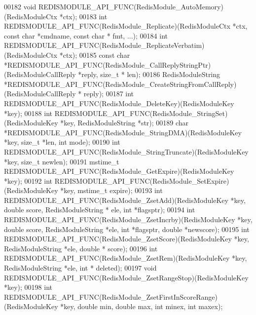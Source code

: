 \begin{DoxyCode}
00182 \textcolor{keywordtype}{void} REDISMODULE\_API\_FUNC(RedisModule\_AutoMemory)(RedisModuleCtx *ctx);
00183 \textcolor{keywordtype}{int} REDISMODULE\_API\_FUNC(RedisModule\_Replicate)(RedisModuleCtx *ctx, \textcolor{keyword}{const} \textcolor{keywordtype}{char} *cmdname, \textcolor{keyword}{const} \textcolor{keywordtype}{char} *
      fmt, ...);
00184 \textcolor{keywordtype}{int} REDISMODULE\_API\_FUNC(RedisModule\_ReplicateVerbatim)(RedisModuleCtx *ctx);
00185 \textcolor{keyword}{const} \textcolor{keywordtype}{char} *REDISMODULE\_API\_FUNC(RedisModule\_CallReplyStringPtr)(RedisModuleCallReply *reply, size\_t *
      len);
00186 RedisModuleString *REDISMODULE\_API\_FUNC(RedisModule\_CreateStringFromCallReply)(RedisModuleCallReply *
      reply);
00187 \textcolor{keywordtype}{int} REDISMODULE\_API\_FUNC(RedisModule\_DeleteKey)(RedisModuleKey *key);
00188 \textcolor{keywordtype}{int} REDISMODULE\_API\_FUNC(RedisModule\_StringSet)(RedisModuleKey *key, RedisModuleString *str);
00189 \textcolor{keywordtype}{char} *REDISMODULE\_API\_FUNC(RedisModule\_StringDMA)(RedisModuleKey *key, size\_t *len, \textcolor{keywordtype}{int} mode);
00190 \textcolor{keywordtype}{int} REDISMODULE\_API\_FUNC(RedisModule\_StringTruncate)(RedisModuleKey *key, size\_t newlen);
00191 mstime\_t REDISMODULE\_API\_FUNC(RedisModule\_GetExpire)(RedisModuleKey *key);
00192 \textcolor{keywordtype}{int} REDISMODULE\_API\_FUNC(RedisModule\_SetExpire)(RedisModuleKey *key, mstime\_t expire);
00193 \textcolor{keywordtype}{int} REDISMODULE\_API\_FUNC(RedisModule\_ZsetAdd)(RedisModuleKey *key, \textcolor{keywordtype}{double} score, RedisModuleString *
      ele, \textcolor{keywordtype}{int} *flagsptr);
00194 \textcolor{keywordtype}{int} REDISMODULE\_API\_FUNC(RedisModule\_ZsetIncrby)(RedisModuleKey *key, \textcolor{keywordtype}{double} score, RedisModuleString 
      *ele, \textcolor{keywordtype}{int} *flagsptr, \textcolor{keywordtype}{double} *newscore);
00195 \textcolor{keywordtype}{int} REDISMODULE\_API\_FUNC(RedisModule\_ZsetScore)(RedisModuleKey *key, RedisModuleString *ele, \textcolor{keywordtype}{double} *
      score);
00196 \textcolor{keywordtype}{int} REDISMODULE\_API\_FUNC(RedisModule\_ZsetRem)(RedisModuleKey *key, RedisModuleString *ele, \textcolor{keywordtype}{int} *
      deleted);
00197 \textcolor{keywordtype}{void} REDISMODULE\_API\_FUNC(RedisModule\_ZsetRangeStop)(RedisModuleKey *key);
00198 \textcolor{keywordtype}{int} REDISMODULE\_API\_FUNC(RedisModule\_ZsetFirstInScoreRange)(RedisModuleKey *key, \textcolor{keywordtype}{double} min, \textcolor{keywordtype}{double} 
      max, \textcolor{keywordtype}{int} minex, \textcolor{keywordtype}{int} maxex);

\end{DoxyCode}
